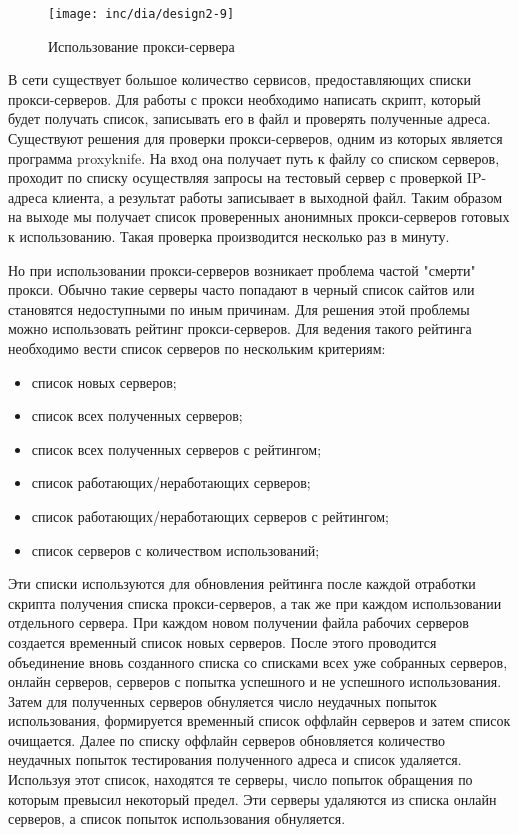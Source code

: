 \begin{figure}
  \centering
  \texttt{[image: inc/dia/design2-9]}
  \caption{Использование прокси-сервера}
  \label{fig:fig09}
\end{figure}

В сети существует большое количество сервисов, предоставляющих списки прокси-серверов. Для работы с прокси необходимо написать скрипт, который будет получать список, записывать его в файл и проверять полученные адреса. Существуют решения для проверки прокси-серверов, одним из которых является программа proxyknife. На вход она получает путь к файлу со списком серверов, проходит по списку осуществляя запросы на тестовый сервер с проверкой IP-адреса клиента, а результат работы записывает в выходной файл. Таким образом на выходе мы получает список проверенных анонимных прокси-серверов готовых к использованию. Такая проверка производится несколько раз в минуту.

Но при использовании прокси-серверов возникает проблема частой "смерти" прокси. Обычно такие серверы часто попадают в черный список сайтов или становятся недоступными по иным причинам. Для решения этой проблемы можно использовать рейтинг прокси-серверов. Для ведения такого рейтинга необходимо вести список серверов по нескольким критериям:

\begin{itemize}
\item список новых серверов;
\item список всех полученных серверов;
\item список всех полученных серверов с рейтингом;
\item список работающих/неработающих серверов;
\item список работающих/неработающих серверов с рейтингом;
\item список серверов с количеством использований;
\end{itemize}

Эти списки используются для обновления рейтинга после каждой отработки скрипта получения списка прокси-серверов, а так же при каждом использовании отдельного сервера. При каждом новом получении файла рабочих серверов создается временный список новых серверов. После этого проводится объединение вновь созданного списка со списками всех уже собранных серверов, онлайн серверов, серверов с попытка успешного и не успешного использования. Затем для полученных серверов обнуляется число неудачных попыток использования, формируется временный список оффлайн серверов и затем список очищается. Далее по списку оффлайн серверов обновляется количество неудачных попыток тестирования полученного адреса и список удаляется. Используя этот список, находятся те серверы, число попыток обращения по которым превысил некоторый предел. Эти серверы удаляются из списка онлайн серверов, а список попыток использования обнуляется.

